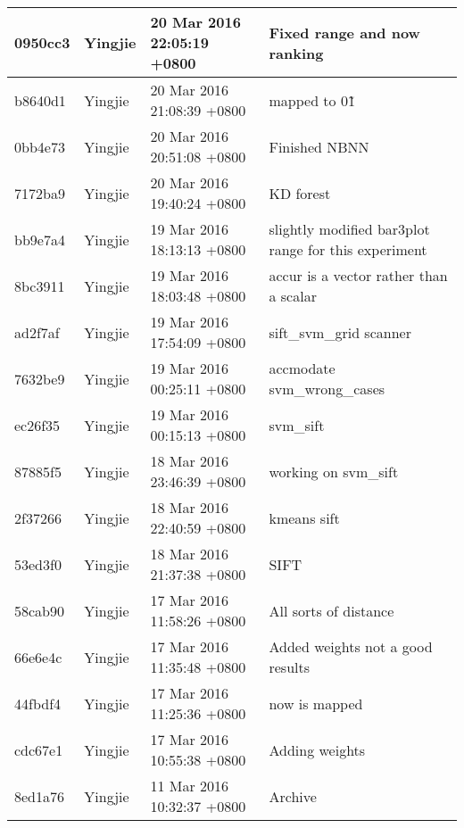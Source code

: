 \begin{longtable}{@{\extracolsep{\fill}}l|l|l|l@{}}
    0950cc3  & Yingjie &  20 Mar 2016 22:05:19 +0800 & Fixed range and now ranking                          \\ \hline
    b8640d1  & Yingjie &  20 Mar 2016 21:08:39 +0800 & mapped to 0\~1                                       \\ \hline
    0bb4e73  & Yingjie &  20 Mar 2016 20:51:08 +0800 & Finished NBNN                                        \\ \hline
    7172ba9  & Yingjie &  20 Mar 2016 19:40:24 +0800 & KD forest                                            \\ \hline
    bb9e7a4  & Yingjie &  19 Mar 2016 18:13:13 +0800 & slightly modified bar3plot range for this experiment \\ \hline
    8bc3911  & Yingjie &  19 Mar 2016 18:03:48 +0800 & accur is a vector rather than a scalar               \\ \hline
    ad2f7af  & Yingjie &  19 Mar 2016 17:54:09 +0800 & sift\_svm\_grid scanner                              \\ \hline
    7632be9  & Yingjie &  19 Mar 2016 00:25:11 +0800 & accmodate svm\_wrong\_cases                          \\ \hline
    ec26f35  & Yingjie &  19 Mar 2016 00:15:13 +0800 & svm\_sift                                            \\ \hline
    87885f5  & Yingjie &  18 Mar 2016 23:46:39 +0800 & working on svm\_sift                                 \\ \hline
    2f37266  & Yingjie &  18 Mar 2016 22:40:59 +0800 & kmeans sift                                          \\ \hline
    53ed3f0  & Yingjie &  18 Mar 2016 21:37:38 +0800 & SIFT                                                 \\ \hline
    58cab90  & Yingjie &  17 Mar 2016 11:58:26 +0800 & All sorts of distance                                \\ \hline
    66e6e4c  & Yingjie &  17 Mar 2016 11:35:48 +0800 & Added weights not a good results                     \\ \hline
    44fbdf4  & Yingjie &  17 Mar 2016 11:25:36 +0800 & now is mapped                                        \\ \hline
    cdc67e1  & Yingjie &  17 Mar 2016 10:55:38 +0800 & Adding weights                                       \\ \hline
    8ed1a76  & Yingjie &  11 Mar 2016 10:32:37 +0800 & Archive                                              \\ \hline

\end{longtable}
